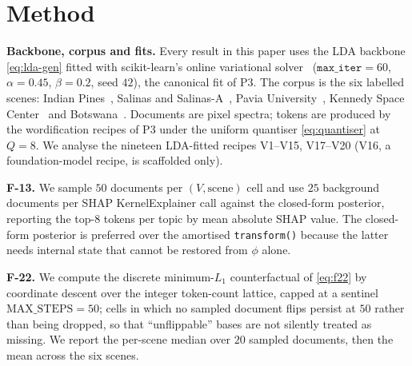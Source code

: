 \documentclass[journal,a4paper,10pt]{IEEEtran}
\begin{document}
\section{Method}\label{sec:method}

\textbf{Backbone, corpus and fits.} Every result in this paper uses
the LDA backbone \eqref{eq:lda-gen} fitted with scikit-learn's
online variational solver~\cite{pedregosa2011scikit, hoffman2010online}
($\mathtt{max\_iter}=60$, $\alpha=0.45$, $\beta=0.2$, seed $42$),
the canonical fit of P3. The corpus is the six labelled scenes:
Indian Pines~\cite{baumgardner1992indianpines}, Salinas and
Salinas-A~\cite{aviris_salinas}, Pavia
University~\cite{rosis_pavia}, Kennedy Space
Center~\cite{aviris_ksc} and Botswana~\cite{eo1_botswana}.
Documents are pixel spectra; tokens are produced by the wordification
recipes of P3 under the uniform quantiser \eqref{eq:quantiser} at
$Q=8$. We analyse the nineteen LDA-fitted recipes V1--V15, V17--V20
(V16, a foundation-model recipe, is scaffolded only).

\textbf{F-13.} We sample $50$ documents per $(V,\text{scene})$ cell
and use $25$ background documents per SHAP KernelExplainer call against
the closed-form posterior, reporting the top-$8$ tokens per topic by
mean absolute SHAP value. The closed-form posterior is preferred over
the amortised \texttt{transform()} because the latter needs internal
state that cannot be restored from $\phi$ alone.

\textbf{F-22.} We compute the discrete minimum-$L_1$ counterfactual of
\eqref{eq:f22} by coordinate descent over the integer token-count
lattice, capped at a sentinel $\mathrm{MAX\_STEPS}=50$; cells in which
no sampled document flips persist at $50$ rather than being dropped,
so that ``unflippable'' bases are not silently treated as missing.
We report the per-scene median over $20$ sampled documents, then the
mean across the six scenes.
\end{document}

